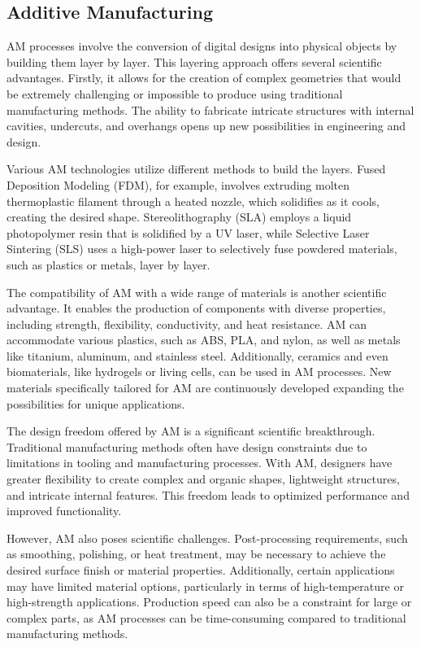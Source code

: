 \subsection{Additive Manufacturing}
AM processes involve the conversion of digital designs into physical objects by building them layer by layer. This layering approach offers several scientific advantages. Firstly, it allows for the creation of complex geometries that would be extremely challenging or impossible to produce using traditional manufacturing methods. The ability to fabricate intricate structures with internal cavities, undercuts, and overhangs opens up new possibilities in engineering and design.

Various AM technologies utilize different methods to build the layers. Fused Deposition Modeling (FDM), for example, involves extruding molten thermoplastic filament through a heated nozzle, which solidifies as it cools, creating the desired shape. Stereolithography (SLA) employs a liquid photopolymer resin that is solidified by a UV laser, while Selective Laser Sintering (SLS) uses a high-power laser to selectively fuse powdered materials, such as plastics or metals, layer by layer.

The compatibility of AM with a wide range of materials is another scientific advantage. It enables the production of components with diverse properties, including strength, flexibility, conductivity, and heat resistance. AM can accommodate various plastics, such as ABS, PLA, and nylon, as well as metals like titanium, aluminum, and stainless steel. Additionally, ceramics and even biomaterials, like hydrogels or living cells, can be used in AM processes. New materials specifically tailored for AM are continuously developed  expanding the possibilities for unique applications.

The design freedom offered by AM is a significant scientific breakthrough. Traditional manufacturing methods often have design constraints due to limitations in tooling and manufacturing processes. With AM, designers have greater flexibility to create complex and organic shapes, lightweight structures, and intricate internal features. This freedom leads to optimized performance and improved functionality.

However, AM also poses scientific challenges. Post-processing requirements, such as smoothing, polishing, or heat treatment, may be necessary to achieve the desired surface finish or material properties. Additionally, certain applications may have limited material options, particularly in terms of high-temperature or high-strength applications. Production speed can also be a constraint for large or complex parts, as AM processes can be time-consuming compared to traditional manufacturing methods.

